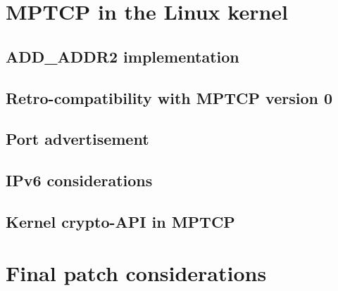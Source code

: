 \section{MPTCP in the Linux kernel}
\subsection{ADD\_ADDR2 implementation}
\subsection{Retro-compatibility with MPTCP version 0}
\subsection{Port advertisement}
\subsection{IPv6 considerations}
\subsection{Kernel crypto-API in MPTCP}
\section{Final patch considerations}
